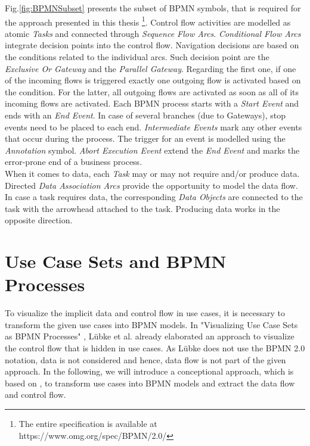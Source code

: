 \noindent
Fig.\ref{fig:BPMNSubset} presents the subset of BPMN symbols, that is required for the approach presented in this thesis \footnote{The entire specification is available at https://www.omg.org/spec/BPMN/2.0/}. Control flow activities are modelled as atomic \textit{Tasks} and connected through \textit{Sequence Flow Arcs}. \textit{Conditional Flow Arcs} integrate decision points into the control flow. Navigation decisions are based on the conditions related to the individual arcs. Such decision point are the \textit{Exclusive Or Gateway} and the \textit{Parallel Gateway}. Regarding the first one, if one of the incoming flows is triggered exactly one outgoing flow is activated based on the condition. For the latter, all outgoing flows are activated as soon as all of its incoming flows are activated. Each BPMN process starts with a \textit{Start Event} and ends with an \textit{End Event}. In case of several branches (due to Gateways), stop events need to be placed to each end. \textit{Intermediate Events} mark any other events that occur during the process. The trigger for an event is modelled using the \textit{Annotation} symbol. \textit{Abort Execution Event} extend the \textit{End Event} and marks the error-prone end of a business process. \\
When it comes to data, each \textit{Task} may or may not require and/or produce data. Directed \textit{Data Association Arcs} provide the opportunity to model the data flow. In case a task requires data, the corresponding \textit{Data Objects} are connected to the task with the arrowhead attached to the task. Producing data works in the opposite direction. \\









\section{Use Case Sets and BPMN Processes}
\label{sec:PrepApproach:TransformUCtoBPMN}
To visualize the implicit data and control flow in use cases, it is necessary to transform the given use cases into BPMN models. In "Visualizing Use Case Sets as BPMN Processes" \cite{VisualizeBPMN}, Lübke et al. already elaborated an approach to visualize the control flow that is hidden in use cases. As Lübke does not use the BPMN 2.0 notation, data is not considered and hence, data flow is not part of the given approach. In the following, we will introduce a conceptional approach, which is based on \cite{VisualizeBPMN}, to transform use cases into BPMN models and extract the data flow and control flow.


